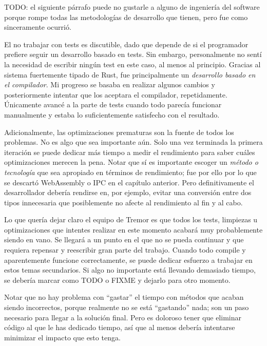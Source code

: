 TODO: el siguiente párrafo puede no gustarle a alguno de ingeniería del software
porque rompe todas las metodologías de desarrollo que tienen, pero fue como
sinceramente ocurrió.

El no trabajar con tests es discutible, dado que depende de si el programador
prefiere seguir un desarrollo basado en tests. Sin embargo, personalmente no
sentí la necesidad de escribir ningún test en este caso, al menos al principio.
Gracias al sistema fuertemente tipado de Rust, fue principalmente un
\emph{desarrollo basado en el compilador}. Mi progreso se basaba en realizar
algunos cambios y posteriormente intentar que los aceptara el compilador,
repetidamente. Únicamente avancé a la parte de tests cuando todo parecía
funcionar manualmente y estaba lo suficientemente satisfecho con el resultado.

Adicionalmente, las optimizaciones prematuras son la fuente de todos los
problemas. No es algo que sea importante aún. Solo una vez terminada la primera
iteración se puede dedicar más tiempo a medir el rendimiento para saber cuáles
optimizaciones merecen la pena. Notar que sí es importante escoger un
\emph{método o tecnología} que sea apropiado en términos de rendimiento; fue por
ello por lo que se descartó WebAssembly o IPC en el capítulo anterior. Pero
definitivamente el desarrollador debería rendirse en, por ejemplo, evitar una
conversión entre dos tipos innecesaria que posiblemente no afecte al rendimiento
al fin y al cabo.

Lo que quería dejar claro el equipo de Tremor es que todos los tests, limpiezas
u optimizaciones que intentes realizar en este momento acabará muy probablemente
siendo en vano. Se llegará a un punto en el que no se pueda continuar y que
requiera repensar y reescribir gran parte del trabajo. Cuando todo compile y
aparentemente funcione correctamente, se puede dedicar esfuerzo a trabajar en
estos temas secundarios. Si algo no importante está llevando demasiado tiempo,
se debería marcar como TODO o FIXME y dejarlo para otro momento.

Notar que no hay problema con ``gastar'' el tiempo con métodos que acaban siendo
incorrectos, porque realmente no se está ``gastando'' nada; son un paso
necesario para llegar a la solución final. Pero es doloroso tener que eliminar
código al que le has dedicado tiempo, así que al menos debería intentarse
minimizar el impacto que esto tenga.

\section{\abistable}

